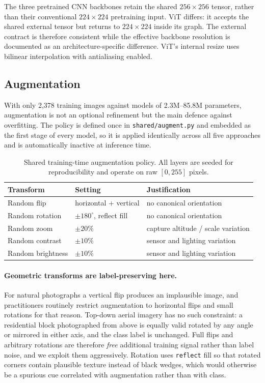 \documentclass[11pt,twoside,a4paper]{article}
\begin{document}
The three pretrained CNN backbones retain the shared $256 \times 256$ tensor,
rather than their conventional $224 \times 224$ pretraining input. ViT differs:
it accepts the shared external tensor but returns to $224 \times 224$ inside
its graph. The external contract is therefore consistent while the effective
backbone resolution is documented as an architecture-specific difference.
ViT's internal resize uses bilinear interpolation with antialiasing enabled.

\subsection{Augmentation}
\label{sec:augmentation}

With only 2{,}378 training images against models of 2.3M--85.8M parameters,
augmentation is not an optional refinement but the main defence against
overfitting. The policy is defined once in \texttt{shared/augment.py} and
embedded as the first stage of every model, so it is applied identically across
all five approaches and is automatically inactive at inference time.

\begin{table}[H]
\centering
\caption{Shared training-time augmentation policy. All layers are seeded for
reproducibility and operate on raw $[0,255]$ pixels.}
\label{tab:augmentation}
\small
\begin{tabular}{lll}
\toprule
Transform & Setting & Justification \\
\midrule
Random flip & horizontal + vertical & no canonical orientation \\
Random rotation & $\pm 180^\circ$, reflect fill & no canonical orientation \\
Random zoom & $\pm 20\%$ & capture altitude / scale variation \\
Random contrast & $\pm 10\%$ & sensor and lighting variation \\
Random brightness & $\pm 10\%$ & sensor and lighting variation \\
\bottomrule
\end{tabular}
\end{table}

\paragraph{Geometric transforms are label-preserving here.}
For natural photographs a vertical flip produces an implausible image, and
practitioners routinely restrict augmentation to horizontal flips and small
rotations for that reason. Top-down aerial imagery has no such constraint: a
residential block photographed from above is equally valid rotated by any
angle or mirrored in either axis, and the class label is unchanged. Full
flips and arbitrary rotations are therefore \emph{free} additional training
signal rather than label noise, and we exploit them aggressively. Rotation
uses \texttt{reflect} fill so that rotated corners contain plausible texture
instead of black wedges, which would otherwise be a spurious cue correlated
with augmentation rather than with class.
\end{document}

